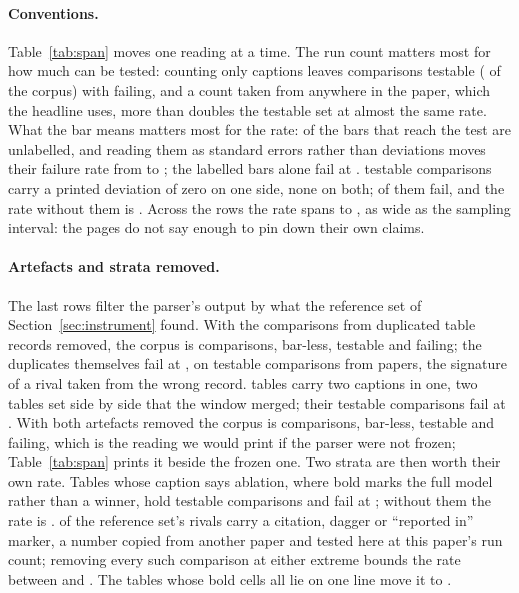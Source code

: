 \documentclass[sigconf,anonymous]{aamas}
\begin{document}
\paragraph{Conventions.} Table~\ref{tab:span} moves one reading at a time.
The run count matters most for how much can be tested: counting only
captions leaves \nStrictN{} comparisons testable (\nStrictTestable{} of the
corpus) with \nStrictFail{} failing, and a count taken from anywhere in the
paper, which the headline uses, more than doubles the testable set at almost
the same rate. What the bar means matters most for the rate:
\nBarsUnlabelledPct{} of the bars that reach the test are unlabelled, and
reading them as standard errors rather than deviations moves their failure
rate from \nBarsAsStdFail{} to \nBarsAsSemFail{}; the labelled bars alone
fail at \nBarsLabelledFail{}. \nRZeroN{} testable comparisons carry a
printed deviation of zero on one side, none on both; \nRZeroFail{} of them
fail, and the rate without them is \nRZeroRemovedFail{}. Across the rows the
rate spans \nSpanLo{} to \nSpanHi{}, as wide as the sampling interval: the
pages do not say enough to pin down their own claims.

\paragraph{Artefacts and strata removed.} The last rows filter the parser's
output by what the reference set of Section~\ref{sec:instrument} found.
With the \nRDupOnlyN{} comparisons from duplicated table records removed,
the corpus is \nRDupRemovedN{} comparisons, \nRDupRemovedNeither{} bar-less,
\nRDupRemovedTestable{} testable and \nRDupRemovedFail{} failing; the
duplicates themselves fail at \nRDupOnlyFail{}, on \nRDupOnlyTestableN{}
testable comparisons from \nRDupOnlyTestablePapers{} papers, the signature
of a rival taken from the wrong record. \nRMergedTables{} tables carry two
captions in one, two tables set side by side that the window merged; their
\nRMergedOnlyTestableN{} testable comparisons fail at \nRMergedOnlyFail{}.
With both artefacts removed the corpus is \nRArtefactsRemovedN{}
comparisons, \nRArtefactsRemovedNeither{} bar-less,
\nRArtefactsRemovedTestable{} testable and \nRArtefactsRemovedFail{}
failing, which is the reading we would print if the parser were not frozen;
Table~\ref{tab:span} prints it beside the frozen one. Two strata are then worth
their own rate. Tables whose caption says ablation, where bold marks the
full model rather than a winner, hold \nRAblationOnlyTestableN{} testable
comparisons and fail at \nRAblationOnlyFail{}; without them the rate is
\nRAblationRemovedFail{}. \nGRivalCopied{} of the reference set's rivals
carry a citation, dagger or ``reported in'' marker, a number copied from
another paper and tested here at this paper's run count; removing every such
comparison at either extreme bounds the rate between
\nFailCopiedRemovedLow{} and \nFailCopiedRemovedHigh{}. The \nROwnRowTables{}
tables whose bold cells all lie on one line move it to
\nROwnRowRemovedFail{}.
\end{document}
